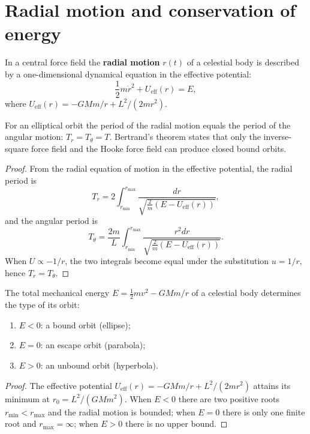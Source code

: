 \section{Radial motion and conservation of energy}

\begin{definition}\label{def:radial_motion}
In a central force field the \textbf{radial motion} \(r(t)\) of a celestial body is described by a one-dimensional dynamical equation in the effective potential:
\[
\frac12m\dot r^2+U_{\text{eff}}(r)=E,
\]
where \(U_{\text{eff}}(r)=-GMm/r+L^2/(2mr^2)\).
\end{definition}

\begin{proposition}\label{prop:radial_oscillation_period}
For an elliptical orbit the period of the radial motion equals the period of the angular motion: \(T_r=T_\theta=T\). Bertrand's theorem states that only the inverse-square force field and the Hooke force field can produce closed bound orbits.
\end{proposition}

\begin{proof}
From the radial equation of motion in the effective potential, the radial period is
\[
T_r=2\int_{r_{\min}}^{r_{\max}}\frac{dr}{\sqrt{\frac2m(E-U_{\text{eff}}(r))}},
\]
and the angular period is
\[
T_\theta=\frac{2m}{L}\int_{r_{\min}}^{r_{\max}}\frac{r^2dr}{\sqrt{\frac2m(E-U_{\text{eff}}(r))}}.
\]
When \(U\propto-1/r\), the two integrals become equal under the substitution \(u=1/r\), hence \(T_r=T_\theta\).
\end{proof}

\begin{proposition}\label{prop:energy_orbital_type}
The total mechanical energy \(E=\frac12mv^2-GMm/r\) of a celestial body determines the type of its orbit:
\begin{enumerate}[label=(\roman*)]
    \item \(E<0\): a bound orbit (ellipse);
    \item \(E=0\): an escape orbit (parabola);
    \item \(E>0\): an unbound orbit (hyperbola).
\end{enumerate}
\end{proposition}

\begin{proof}
The effective potential \(U_{\text{eff}}(r)=-GMm/r+L^2/(2mr^2)\) attains its minimum at \(r_0=L^2/(GMm^2)\). When \(E<0\) there are two positive roots \(r_{\min}<r_{\max}\) and the radial motion is bounded; when \(E=0\) there is only one finite root and \(r_{\max}=\infty\); when \(E>0\) there is no upper bound.
\end{proof}

